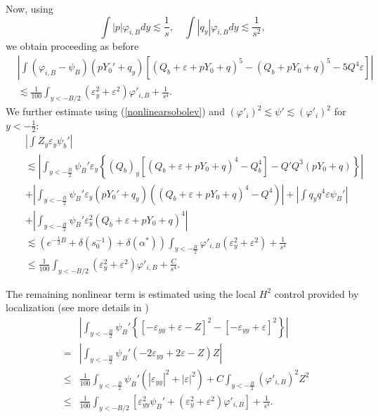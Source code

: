 \documentclass[11pt,a4paper,reqno]{amsart}
\theoremstyle{remark}
\numberwithin{equation}{section}
\newcommand{\be}{\begin{equation}}
\newcommand{\ee}{\end{equation}}
\newcommand{\bee}{\begin{eqnarray*}}
\newcommand{\eee}{\end{eqnarray*}}
\def\fref#1{{\rm (\ref{#1})}}
\def\e{\varepsilon}
\def\fref#1{{\rm (\ref{#1})}}
\def\Yz{Y_0}
\begin{document}
Now, using
\be\label{BSqy}
\int  |p|  \varphi_{i,B} dy \lesssim \frac 1{s}, 
\quad \int  |q_y|    \varphi_{i,B} dy \lesssim \frac 1{s^2},  \ee
we obtain proceeding as before
\begin{align*}
&\left|\int (\varphi_{i,B}-\psi_B)(p  \Yz'+q_y) [(Q_b+\e+p\Yz+q)^5-(Q_b +p\Yz+q)^5-5Q^4\e]
\right|\\ &\lesssim     \frac 1{100} \int_{y<-B/2} (\e_y^2+\varepsilon^2)  \varphi'_{i,B}+\frac 1{s^4}.
\end{align*}
  We further estimate using \fref{nonlinearsobolev} and   $(\varphi'_i)^2\lesssim \psi'\lesssim (\varphi'_i)^2$ for $y<-\frac 12$:
\bee
&& \left|\int Z_y \e_y \psi_b'\right| \\&& \lesssim 
\left|\int_{y<-\frac B2}\psi_B'\e_y\left\{(Q_b)_y[(Q_b+\e+p\Yz+q)^4-Q_b^4]-Q'Q^3(p\Yz+q)\right\} \right|\\
&&+\left|\int_{y<-\frac B2}\psi_B'\e_y   (p\Yz'+q_y) ((Q_b+\e+p\Yz+q)^4-Q^4) \right| + \left| \int q_y q^4 \e\psi_B'\right|\\
&& +\left| \int_{y<-\frac B2}\psi_B'\e_y^2 (Q_b+\e+p\Yz+q)^4\right|\\
&& \lesssim  \left( e^{- \frac 12 B} +\delta(s_0^{-1}) +\delta(\alpha^*)\right) \int_{y<-\frac B2}\varphi'_{i,B}(\e_y^2+\e^2) 
+\frac 1{s^4}\\
&& \leq 
 \frac 1{100}  \int_{y<-B/2}  (\e_y^2+\varepsilon^2)  \varphi'_{i,B}+\frac C{s^4}.
\eee
 
The remaining nonlinear term is estimated using the local $H^2$ control provided by localization
(see more details in \cite{MMR1})
\bee
& & \left|\int_{y<-\frac B2}\psi_B'\left\{\left[-\e_{yy}+ \varepsilon  -Z\right]^2-\left[-\e_{yy}+\e\right]^2\right\}\right|
\\
&=&   \left|\int_{y<-\frac B2}\psi_B' \left(-2\e_{yy}+ 2\varepsilon  -Z\right)  Z  \right|\\
& \leq & \frac{1}{100}\int_{y<-\frac B2}\psi_{B}'(|\e_{yy}|^2+|\e|^2)+C\int_{y<-\frac B2}(\varphi'_{i,B})^2Z^2\\
& \leq &  \frac 1{100} \int_{y<-B/2} \left[ \e_{yy}^2\psi_B'+(\e_y^2+\varepsilon^2)  \varphi'_{i,B}\right]
+\frac 1{s^4}.
\eee
\end{document}
